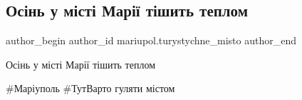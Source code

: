  
 
 
 
 

\subsection{Осінь у місті Марії тішить теплом}
\label{sec:18_10_2021.fb.mariupol.turystychne_misto.1.osin_u_misti_marii_tishyt_teplom}

\ifcmt
 author_begin
   author_id mariupol.turystychne_misto
 author_end
\fi

Осінь у місті Марії тішить теплом🍁

\#Маріуполь \#ТутВарто гуляти містом
